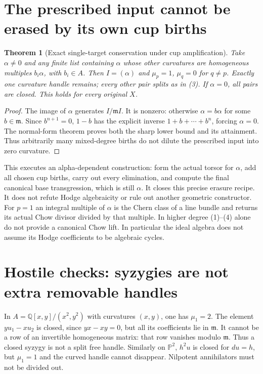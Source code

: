 \documentclass[11pt]{article}
\newtheorem{theorem}{Theorem}
\newcommand{\Q}{\mathbb Q}
\newcommand{\m}{\mathfrak m}
\begin{document}
\section{The prescribed input cannot be erased by its own cup births}
\begin{theorem}[Exact single-target conservation under cup amplification]
Take $\alpha\ne0$ and any finite list containing $\alpha$ whose other
curvatures are homogeneous multiples $b_i\alpha$, with $b_i\in A$.
Then $I=(\alpha)$ and $\mu_p=1$, $\mu_q=0$ for $q\ne p$.
Exactly one curvature handle remains; every other pair splits as in (3).
If $\alpha=0$, all pairs are closed. This holds for every original $X$.
\end{theorem}
\begin{proof}
The image of $\alpha$ generates $I/\m I$. It is nonzero: otherwise
$\alpha=b\alpha$ for some $b\in\m$. Since $b^{n+1}=0$,
$1-b$ has the explicit inverse $1+b+\cdots+b^n$, forcing $\alpha=0$.
The normal-form theorem proves both the sharp lower bound and its
attainment. Thus arbitrarily many mixed-degree births do not dilute the
prescribed input into zero curvature.
\end{proof}

This executes an alpha-dependent construction: form the actual torsor for
$\alpha$, add all chosen cup births, carry out every elimination, and
compute the final canonical base transgression, which is still $\alpha$.
It closes this precise erasure recipe. It does not refute Hodge algebraicity
or rule out another geometric constructor. For $p=1$ an integral multiple
of $\alpha$ is the Chern class of a line bundle and returns its actual
Chow divisor divided by that multiple. In higher degree (1)--(4) alone
do not provide a canonical Chow lift. In particular the ideal algebra
does not assume its Hodge coefficients to be algebraic cycles.

\section{Hostile checks: syzygies are not extra removable handles}
In $A=\Q[x,y]/(x^2,y^2)$ with curvatures $(x,y)$, one has $\mu_1=2$.
The element $y u_1-x u_2$ is closed, since $yx-xy=0$, but all its
coefficients lie in $\m$. It cannot be a row of an invertible homogeneous
matrix: that row vanishes modulo $\m$. Thus a closed syzygy is not a
split free handle. Similarly on $\mathbb P^2$, $h^2u$ is closed for
$du=h$, but $\mu_1=1$ and the curved handle cannot disappear. Nilpotent
annihilators must not be divided out.
\end{document}
